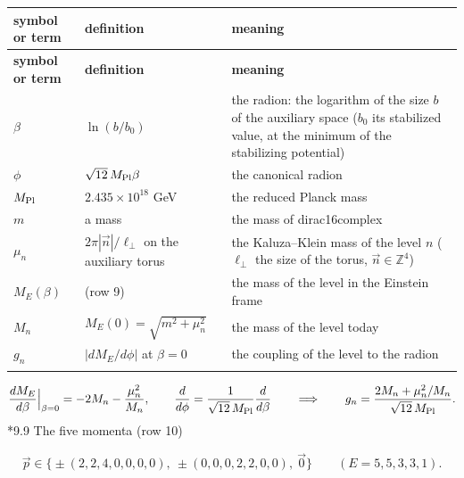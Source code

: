 \documentclass[10pt,a4paper]{article}
\makeatletter
\renewcommand\subsection{\@startsection{subsection}{2}{\z@}{-3.25ex\@plus -1ex \@minus -.2ex}{1.5ex \@plus .2ex}{\normalfont\large\bfseries\raggedright}}
\makeatother
\begin{document}
{\footnotesize
\begin{longtable}{>{\raggedright\arraybackslash}p{}>{\raggedright\arraybackslash}p{}>{\raggedright\arraybackslash}p{}}
\toprule
\textbf{symbol or term} & \textbf{definition} & \textbf{meaning} \\
\midrule\endfirsthead
\toprule
\textbf{symbol or term} & \textbf{definition} & \textbf{meaning} \\
\midrule\endhead
\endfoot
\bottomrule\endlastfoot
$\beta$ & $\ln(b/b_0)$ & the radion: the logarithm of the size $b$ of the auxiliary space ($b_0$ its stabilized value, at the minimum of the stabilizing potential) \\
$\phi$ & $\sqrt{12}\,M_{\rm Pl}\beta$ & the canonical radion \\
$M_{\rm Pl}$ & $2.435\times10^{18}$ GeV & the reduced Planck mass \\
$m$ & a mass & the mass of dirac16complex \\
$\mu_n$ & $2\pi|\vec n|/\ell_\perp$ on the auxiliary torus & the Kaluza–Klein mass of the level $n$ ($\ell_\perp$ the size of the torus, $\vec n\in\mathbb Z^4$) \\
$M_E(\beta)$ & (row 9) & the mass of the level in the Einstein frame \\
$M_n$ & $M_E(0)=\sqrt{m^2+\mu_n^2}$ & the mass of the level today \\
$g_n$ & $|dM_E/d\phi|$ at $\beta=0$ & the coupling of the level to the radion \\*
\end{longtable}}
\begin{equation*}
\frac{dM_E}{d\beta}\Big|_{\beta=0}=-2M_n-\frac{\mu_n^2}{M_n},\qquad \frac{d}{d\phi}=\frac1{\sqrt{12}\,M_{\rm Pl}}\frac d{d\beta}\qquad\Longrightarrow\qquad g_n=\frac{2M_n+\mu_n^2/M_n}{\sqrt{12}\,M_{\rm Pl}} .
\end{equation*}
\subsection*{9.9 The five momenta (row 10)}
\begin{equation*}
\vec p\in\big\{\pm(2,2,4,0,0,0,0),\ \pm(0,0,0,2,2,0,0),\ \vec 0\big\}\qquad(E=5,5,3,3,1).
\end{equation*}
\end{document}
